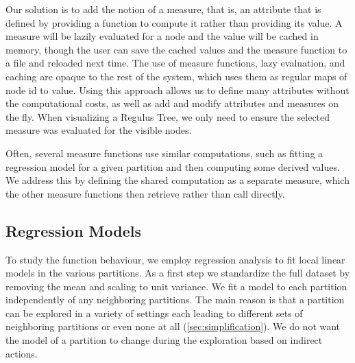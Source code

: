 Our solution is to add the notion of a measure, that is, an attribute that is defined by providing a function to compute it rather than providing its value. A measure will be lazily evaluated for a node and the value will be cached in memory, though the user can save the cached values and the measure function to a file and reloaded next time. The use of measure functions, lazy evaluation, and caching are opaque to the rest of the system, which uses them as regular maps of node id to value. Using this approach allows us to define many attributes without the computational costs, as well as add and modify attributes and measures on the fly. When visualizing a Regulus Tree, we only need to ensure the selected measure was evaluated for the visible nodes. 

Often, several measure functions use similar computations, such as fitting a regression model for a given partition and then computing some derived values. We address this by defining the shared computation as a separate measure, which the other measure functions then retrieve rather than call directly. 

           

\subsection{Regression Models}
\label{sec:models}
To study the function behaviour, we employ regression analysis to fit local linear models in the various partitions. As a first step we standardize the full dataset by removing the mean and scaling to unit variance.  We fit a model to each partition independently of any neighboring partitions. The main reason is that a partition can be explored in a variety of settings each leading to different sets of neighboring partitions or even none at all (\autoref{sec:simplification}). We do not want the model of a partition to change during the exploration based on indirect actions. 

